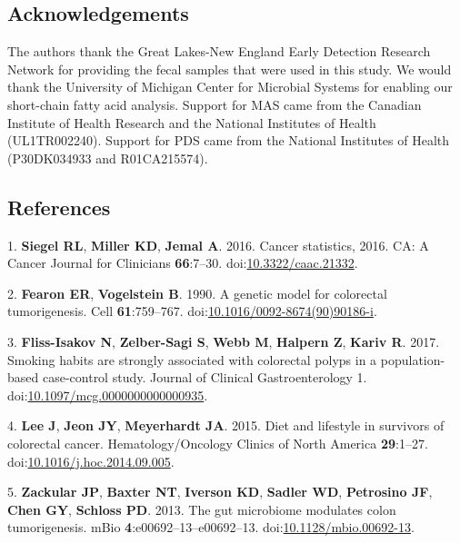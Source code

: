\documentclass[11pt,]{article}
\begin{document}
\newpage

\hypertarget{acknowledgements}{%
\subsection{Acknowledgements}\label{acknowledgements}}

The authors thank the Great Lakes-New England Early Detection Research
Network for providing the fecal samples that were used in this study. We
would thank the University of Michigan Center for Microbial Systems for
enabling our short-chain fatty acid analysis. Support for MAS came from
the Canadian Institute of Health Research and the National Institutes of
Health (UL1TR002240). Support for PDS came from the National Institutes
of Health (P30DK034933 and R01CA215574).

\newpage

\hypertarget{references}{%
\subsection{References}\label{references}}

\hypertarget{refs}{}
\leavevmode\hypertarget{ref-Siegel2016}{}%
1. \textbf{Siegel RL}, \textbf{Miller KD}, \textbf{Jemal A}. 2016.
Cancer statistics, 2016. CA: A Cancer Journal for Clinicians
\textbf{66}:7--30.
doi:\href{https://doi.org/10.3322/caac.21332}{10.3322/caac.21332}.

\leavevmode\hypertarget{ref-Fearon1990}{}%
2. \textbf{Fearon ER}, \textbf{Vogelstein B}. 1990. A genetic model for
colorectal tumorigenesis. Cell \textbf{61}:759--767.
doi:\href{https://doi.org/10.1016/0092-8674(90)90186-i}{10.1016/0092-8674(90)90186-i}.

\leavevmode\hypertarget{ref-FlissIsakov2017}{}%
3. \textbf{Fliss-Isakov N}, \textbf{Zelber-Sagi S}, \textbf{Webb M},
\textbf{Halpern Z}, \textbf{Kariv R}. 2017. Smoking habits are strongly
associated with colorectal polyps in a population-based case-control
study. Journal of Clinical Gastroenterology 1.
doi:\href{https://doi.org/10.1097/mcg.0000000000000935}{10.1097/mcg.0000000000000935}.

\leavevmode\hypertarget{ref-Lee2015}{}%
4. \textbf{Lee J}, \textbf{Jeon JY}, \textbf{Meyerhardt JA}. 2015. Diet
and lifestyle in survivors of colorectal cancer. Hematology/Oncology
Clinics of North America \textbf{29}:1--27.
doi:\href{https://doi.org/10.1016/j.hoc.2014.09.005}{10.1016/j.hoc.2014.09.005}.

\leavevmode\hypertarget{ref-Zackular2013}{}%
5. \textbf{Zackular JP}, \textbf{Baxter NT}, \textbf{Iverson KD},
\textbf{Sadler WD}, \textbf{Petrosino JF}, \textbf{Chen GY},
\textbf{Schloss PD}. 2013. The gut microbiome modulates colon
tumorigenesis. mBio \textbf{4}:e00692--13--e00692--13.
doi:\href{https://doi.org/10.1128/mbio.00692-13}{10.1128/mbio.00692-13}.
\end{document}
